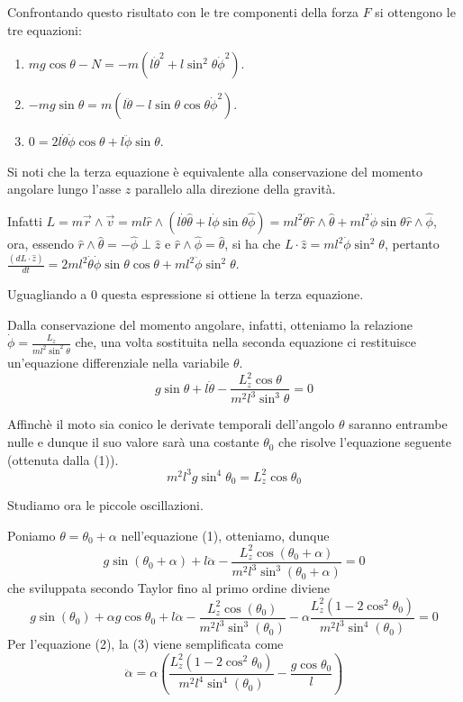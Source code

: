 \documentclass[../main.tex]{subfiles}
\begin{document}
Confrontando questo risultato con le tre componenti della forza $F$ si ottengono le tre equazioni:
\begin{enumerate}
 \item $mg\cos\theta -N=-m(l\dot{\theta}^2+l\sin^2\theta\dot{\phi}^2)$.
 \item $-mg\sin\theta=m(l\ddot{\theta}-l\sin\theta\cos\theta\dot{\phi}^2)$.
 \item $0=2l\dot{\theta}\dot{\phi}\cos\theta+l\ddot{\phi}\sin\theta$.
\end{enumerate}
Si noti che la terza equazione \`e equivalente alla conservazione del momento angolare lungo l'asse $z$ parallelo alla direzione della gravit\`a.

Infatti $L=m\vec{r}\wedge\vec{v}=ml\hat{r}\wedge(l\dot{\theta}\hat{\theta}+l\dot{\phi}\sin\theta\hat{\phi})=ml^2\dot{\theta}\hat{r}\wedge\hat{\theta}+ml^2\dot{\phi}\sin\theta\hat{r}\wedge\hat{\phi}$, ora, essendo $\hat{r}\wedge\hat{\theta}=-\hat{\phi}\perp\hat{z}$ e $\hat{r}\wedge\hat{\phi}=\hat{\theta}$, si ha che
$L\cdot\hat{z}=ml^2\dot{\phi}\sin^2\theta$, pertanto $\displaystyle \frac{(dL\cdot\hat{z})}{dt}=2ml^2\dot{\theta}\dot{\phi}\sin\theta\cos\theta+ml^2\ddot{\phi}\sin^2\theta$.

Uguagliando a 0 questa espressione si ottiene la terza equazione.

Dalla conservazione del momento angolare, infatti, otteniamo la relazione $\displaystyle \dot{\phi}=\frac{L_z}{ml^2\sin^2\theta}$ che, una volta sostituita nella seconda equazione ci restituisce un'equazione differenziale nella variabile $\theta$.
\begin{equation}
g\sin\theta+l\ddot{\theta}-\frac{L_z^2\cos\theta}{m^2l^3\sin^3\theta}=0
\end{equation}

Affinch\`e il moto sia conico le derivate temporali dell'angolo $\theta$ saranno entrambe nulle e dunque il suo valore sar\`a una costante $\theta_0$ che risolve l'equazione seguente (ottenuta dalla (1)).
\begin{equation}
m^2l^3g\sin^4\theta_0=L_z^2\cos\theta_0
\end{equation}

Studiamo ora le piccole oscillazioni.

Poniamo $\theta=\theta_0+\alpha$ nell'equazione (1), otteniamo, dunque
$$ g\sin(\theta_0+\alpha)+l\ddot{\alpha}-\frac{L_z^2\cos(\theta_0+\alpha)}{m^2l^3\sin^3(\theta_0+\alpha)}=0 $$
che sviluppata secondo Taylor fino al primo ordine diviene
\begin{equation}
g\sin(\theta_0)+\alpha g\cos\theta_0+l\ddot{\alpha}-\frac{L_z^2\cos(\theta_0)}{m^2l^3\sin^3(\theta_0)}-\alpha\frac{L_z^2(1-2\cos^2\theta_0)}{m^2l^3\sin^4(\theta_0)}=0
\end{equation}
Per l'equazione (2), la (3) viene semplificata come
\begin{equation}
\ddot{\alpha}=\alpha\left({\frac{L_z^2(1-2\cos^2\theta_0)}{m^2l^4\sin^4(\theta_0)}-\frac{g\cos\theta_0}{l}}\right)
\end{equation}
\end{document}
